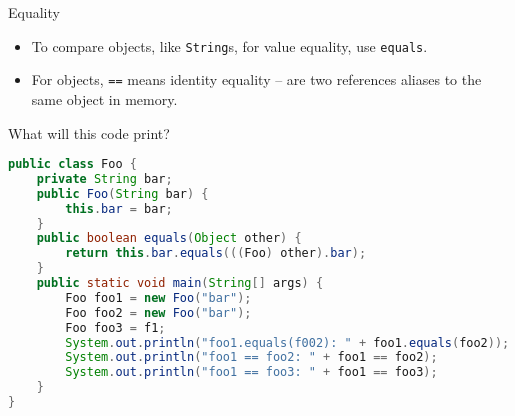 \documentclass{beamer}
\begin{document}
\begin{frame}[fragile]{Equality}
\vspace{-.05in}
\begin{itemize}
\item To compare objects, like {\tt String}s, for value equality, use {\tt equals}.
\item For objects, {\tt ==} means identity equality -- are two references aliases to the same object in memory.
\end{itemize}

What will this code print?
\begin{lstlisting}[language=Java]
public class Foo {
    private String bar;
    public Foo(String bar) {
        this.bar = bar;
    }
    public boolean equals(Object other) {
        return this.bar.equals(((Foo) other).bar);
    }
    public static void main(String[] args) {
        Foo foo1 = new Foo("bar");
        Foo foo2 = new Foo("bar");
        Foo foo3 = f1;
        System.out.println("foo1.equals(f002): " + foo1.equals(foo2));
        System.out.println("foo1 == foo2: " + foo1 == foo2);
        System.out.println("foo1 == foo3: " + foo1 == foo3);
    }
}
\end{lstlisting}

\end{frame}







\end{document}
